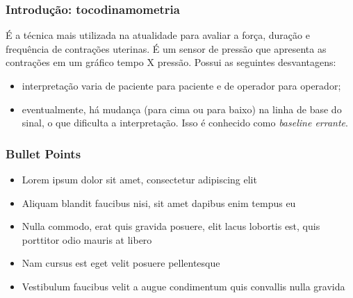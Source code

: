 \documentclass{beamer}
\begin{document}

\begin{frame}
	\frametitle{Introdu\c{c}\~ao: tocodinamometria}	
	
	É a técnica mais utilizada na atualidade para avaliar a força, duração e frequência de contrações uterinas. É um sensor de pressão que apresenta as contrações em um gráfico tempo X pressão. Possui as seguintes desvantagens:
	
	\begin{itemize}
		
		\item interpretação varia de paciente para paciente e de operador para operador;
		
		\item eventualmente, há mudança (para cima ou para baixo) na linha de base do sinal, o que dificulta a interpretação. Isso é conhecido como {\em baseline errante}.
		
	\end{itemize}
	
\end{frame}




\begin{frame}
\frametitle{Bullet Points}
\begin{itemize}
\item Lorem ipsum dolor sit amet, consectetur adipiscing elit
\item Aliquam blandit faucibus nisi, sit amet dapibus enim tempus eu
\item Nulla commodo, erat quis gravida posuere, elit lacus lobortis est, quis porttitor odio mauris at libero
\item Nam cursus est eget velit posuere pellentesque
\item Vestibulum faucibus velit a augue condimentum quis convallis nulla gravida
\end{itemize}
\end{frame}

\end{document}
